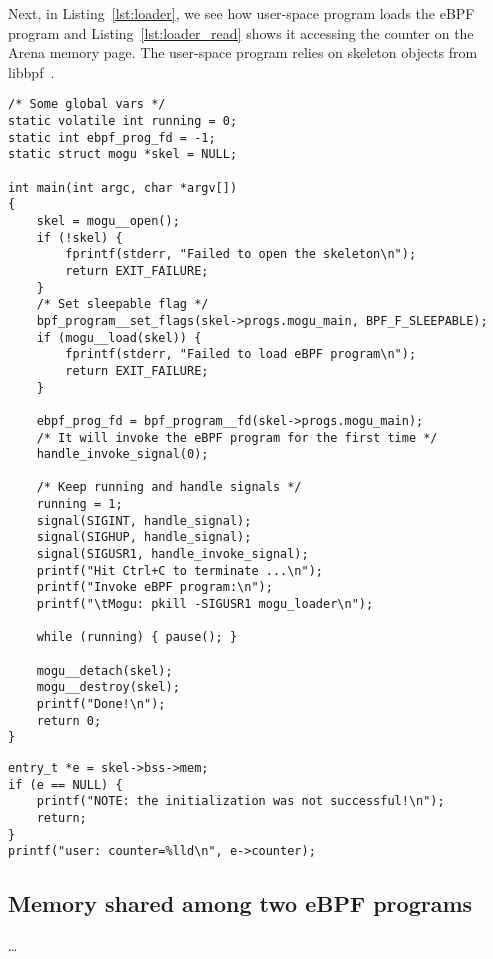 \documentclass{article}
\begin{document}
Next, in Listing~\ref{lst:loader}, we see how user-space program loads the eBPF
program and Listing~\ref{lst:loader_read} shows it accessing the counter on the
Arena memory page. The user-space program relies on skeleton objects from
libbpf~\cite{libbpf_skeleton}.

\begin{minipage}{\linewidth}
\begin{flushleft}
\begin{lstlisting}[caption={User space program loading the program}, label={lst:loader}]
/* Some global vars */
static volatile int running = 0;
static int ebpf_prog_fd = -1;
static struct mogu *skel = NULL;

int main(int argc, char *argv[])
{
    skel = mogu__open();
    if (!skel) {
        fprintf(stderr, "Failed to open the skeleton\n");
        return EXIT_FAILURE;
    }
    /* Set sleepable flag */
    bpf_program__set_flags(skel->progs.mogu_main, BPF_F_SLEEPABLE);
    if (mogu__load(skel)) {
        fprintf(stderr, "Failed to load eBPF program\n");
        return EXIT_FAILURE;
    }

    ebpf_prog_fd = bpf_program__fd(skel->progs.mogu_main);
    /* It will invoke the eBPF program for the first time */
    handle_invoke_signal(0);

    /* Keep running and handle signals */
    running = 1;
    signal(SIGINT, handle_signal);
    signal(SIGHUP, handle_signal);
    signal(SIGUSR1, handle_invoke_signal);
    printf("Hit Ctrl+C to terminate ...\n");
    printf("Invoke eBPF program:\n");
    printf("\tMogu: pkill -SIGUSR1 mogu_loader\n");

    while (running) { pause(); }

    mogu__detach(skel);
    mogu__destroy(skel);
    printf("Done!\n");
    return 0;
}
\end{lstlisting}
\end{flushleft}
\end{minipage}

\begin{minipage}{\linewidth}
\begin{flushleft}
\begin{lstlisting}[caption={User-space accessing the memory page allocated from
Arena}, label={lst:loader_read}]
entry_t *e = skel->bss->mem;
if (e == NULL) {
    printf("NOTE: the initialization was not successful!\n");
    return;
}
printf("user: counter=%lld\n", e->counter);
\end{lstlisting}
\end{flushleft}
\end{minipage}


\subsection{Memory shared among two eBPF programs}

\dots{}




\end{document}
